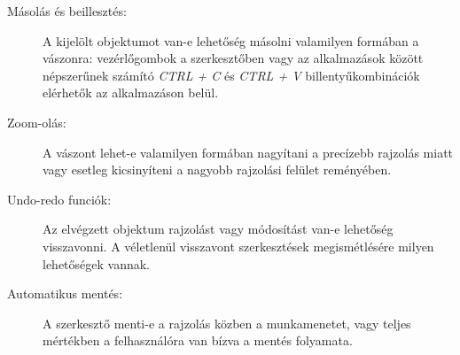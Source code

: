 \begin{description}
	\item[Másolás és beillesztés:] A kijelölt objektumot van-e lehetőség másolni valamilyen formában a vászonra: vezérlőgombok a szerkesztőben vagy az alkalmazások között népszerűnek számító \textit{CTRL + C} és \textit{CTRL + V} billentyűkombinációk elérhetők az alkalmazáson belül.
	\item[Zoom-olás:] A vászont lehet-e valamilyen formában nagyítani a precízebb rajzolás miatt vagy esetleg kicsinyíteni a nagyobb rajzolási felület reményében. 
	\item[Undo-redo funciók:] Az elvégzett objektum rajzolást vagy módosítást van-e lehetőség visszavonni. A véletlenül visszavont szerkesztések megismétlésére milyen lehetőségek vannak.
	\item[Automatikus mentés:] A szerkesztő menti-e a rajzolás közben a munkamenetet, vagy teljes mértékben a felhasználóra van bízva a mentés folyamata.
\end{description}

